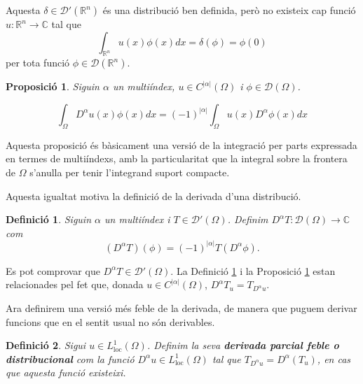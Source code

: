 \documentclass{article}
\numberwithin{equation}{section}
\newtheorem{definicio}{Definici\'{o}}[section]
\newtheorem{proposicio}{Proposici\'{o}}[section]
\begin{document}
Aquesta $\delta\in\mathcal{D}'(\mathbb{R}^n)$ \'{e}s una distribuci\'{o} ben definida, per\`{o} no existeix cap funci\'{o} $u:\mathbb{R}^n\rightarrow\mathbb{C}$ tal que
\[\int_{\mathbb{R}^n}u(x)\phi(x)dx=\delta(\phi)=\phi(0)\]
per tota funci\'{o} $\phi\in\mathcal{D}(\mathbb{R}^n)$.

\begin{proposicio}\label{Pro: integracio per parts multiindex}
Siguin $\alpha$ un multi\'{i}ndex, $u\in C^{|\alpha|}(\Omega)$ i $\phi\in\mathcal{D}(\Omega)$.

\[\int_{\Omega}D^{\alpha}u(x)\phi(x)dx=(-1)^{|\alpha|}\int_{\Omega}u(x)D^{\alpha}\phi(x)dx\]
\end{proposicio}

Aquesta proposici\'{o} \'{e}s b\`{a}sicament una versi\'{o} de la integraci\'{o} per parts expressada en termes de multi\'{i}ndexs, amb la particularitat que la integral sobre la frontera de $\Omega$ s'anul\textperiodcentered la per tenir l'integrand suport compacte.

Aquesta igualtat motiva la definici\'{o} de la derivada d'una distribuci\'{o}.

\begin{definicio}\label{Def: derivada distribucional}
Siguin $\alpha$ un multi\'{i}ndex i $T\in\mathcal{D}'(\Omega)$. Definim $D^{\alpha}T:\mathcal{D}(\Omega)\rightarrow\mathbb{C}$ com
\begin{equation}
(D^{\alpha}T)(\phi)=(-1)^{|\alpha|}T(D^{\alpha}\phi).
\end{equation}
\end{definicio}

Es pot comprovar que $D^{\alpha}T\in\mathcal{D}'(\Omega)$. La Definici\'{o} \ref{Def: derivada distribucional} i la Proposici\'{o} \ref{Pro: integracio per parts multiindex} estan relacionades pel fet que, donada $u\in C^{|\alpha|}(\Omega)$, $D^{\alpha}T_u=T_{D^{\alpha}u}$.

Ara definirem una versi\'{o} m\'{e}s feble de la derivada, de manera que puguem derivar funcions que en el sentit usual no s\'{o}n derivables.

\begin{definicio}\label{Def: derivada feble}
Sigui $u\in L_{\text{loc}}^1(\Omega)$. Definim la seva \textbf{derivada parcial feble o distribucional} com la funci\'{o} $D^{\alpha}u\in L_{\text{loc}}^1(\Omega)$ tal que $T_{D^{\alpha}u}=D^{\alpha}(T_u)$, en cas que aquesta funci\'{o} existeixi. 
\end{definicio}
\end{document}
